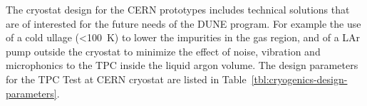 
%
The cryostat design for the CERN prototypes includes technical solutions that are of interested for the future needs of the DUNE program. For example the use of a cold ullage (\textless  100~K) to lower the impurities in the gas region, and of a LAr pump outside the cryostat to minimize the effect of noise, vibration and microphonics to the TPC inside the liquid argon volume.
%
The design parameters for the TPC Test at CERN cryostat are listed in Table~\ref{tbl:cryogenics-design-parameters}.

